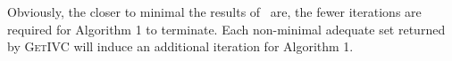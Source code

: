 \vspace{0.09in}
\indent  {}
\vspace{0.09in}
\noindent Obviously, the closer to minimal the results of \getivc ~are,
the fewer iterations are required for Algorithm 1 to terminate.  Each non-minimal adequate set returned by \textsc{GetIVC} will induce an additional iteration for Algorithm 1.

%
%
%
%

